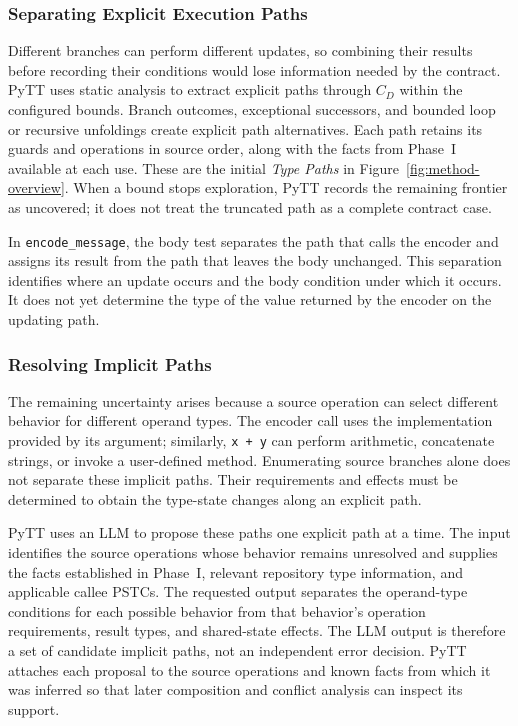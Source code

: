 \subsubsection{Separating Explicit Execution Paths}

Different branches can perform different updates, so combining their
results before recording their conditions would lose information needed
by the contract. PyTT uses static analysis to extract explicit paths
through $C_D$ within the configured bounds. Branch outcomes, exceptional
successors, and bounded loop or recursive unfoldings create explicit path
alternatives. Each path retains its guards and operations in source order,
along with the facts from Phase~I available at each use. These are the
initial \emph{Type Paths} in Figure~\ref{fig:method-overview}. When a bound
stops exploration, PyTT records the remaining frontier as uncovered; it
does not treat the truncated path as a complete contract case.

In \texttt{encode\_message}, the body test separates the path that calls
the encoder and assigns its result from the path that leaves the body
unchanged. This separation identifies where an update occurs and the
body condition under which it occurs. It does not yet determine the
type of the value returned by the encoder on the updating path.

\subsubsection{Resolving Implicit Paths}

The remaining uncertainty arises because a source operation can select
different behavior for different operand types. The encoder call uses
the implementation provided by its argument; similarly,
\texttt{x + y} can perform arithmetic, concatenate strings, or invoke a
user-defined method. Enumerating source branches alone does not separate
these implicit paths. Their requirements and effects must be determined
to obtain the type-state changes along an explicit path.

PyTT uses an LLM to propose these paths one explicit path at a time. The
input identifies the source operations whose behavior remains unresolved
and supplies the facts established in Phase~I, relevant repository type
information, and applicable callee PSTCs. The requested output separates
the operand-type conditions for each possible behavior from that
behavior's operation requirements, result types, and shared-state effects.
The LLM output is therefore a set of candidate implicit paths, not an
independent error decision. PyTT attaches each proposal to the source
operations and known facts from which it was inferred so that later
composition and conflict analysis can inspect its support.

